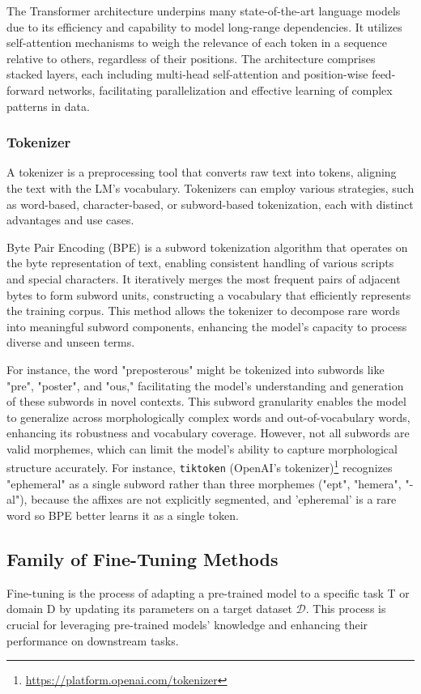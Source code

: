 \documentclass[11pt]{article}
\begin{document}
The Transformer architecture underpins many state-of-the-art language models due to its efficiency and capability to model long-range dependencies. It utilizes self-attention mechanisms to weigh the relevance of each token in a sequence relative to others, regardless of their positions. The architecture comprises stacked layers, each including multi-head self-attention and position-wise feed-forward networks, facilitating parallelization and effective learning of complex patterns in data.

\subsubsection{Tokenizer} \label{app:tokenizer}

A tokenizer is a preprocessing tool that converts raw text into tokens, aligning the text with the LM's vocabulary. Tokenizers can employ various strategies, such as word-based, character-based, or subword-based tokenization, each with distinct advantages and use cases.

Byte Pair Encoding (BPE) is a subword tokenization algorithm that operates on the byte representation of text, enabling consistent handling of various scripts and special characters. It iteratively merges the most frequent pairs of adjacent bytes to form subword units, constructing a vocabulary that efficiently represents the training corpus. This method allows the tokenizer to decompose rare words into meaningful subword components, enhancing the model's capacity to process diverse and unseen terms.

For instance, the word "preposterous" might be tokenized into subwords like "pre", "poster", and "ous," facilitating the model's understanding and generation of these subwords in novel contexts. This subword granularity enables the model to generalize across morphologically complex words and out-of-vocabulary words, enhancing its robustness and vocabulary coverage. However, not all subwords are valid morphemes, which can limit the model's ability to capture morphological structure accurately. For instance, \texttt{tiktoken} (OpenAI's tokenizer)\footnote{\href{https://platform.openai.com/tokenizer}{https://platform.openai.com/tokenizer}} recognizes "ephemeral" as a single subword rather than three morphemes ("ept", "hemera", "-al"), because the affixes are not explicitly segmented, and 'epheremal' is a rare word so BPE better learns it as a single token.

\subsection{Family of Fine-Tuning Methods} \label{app:finetuning}
Fine-tuning is the process of adapting a pre-trained model to a specific task T or domain D by updating its parameters on a target dataset \(\mathcal{D}\). This process is crucial for leveraging pre-trained models' knowledge and enhancing their performance on downstream tasks.
\end{document}
